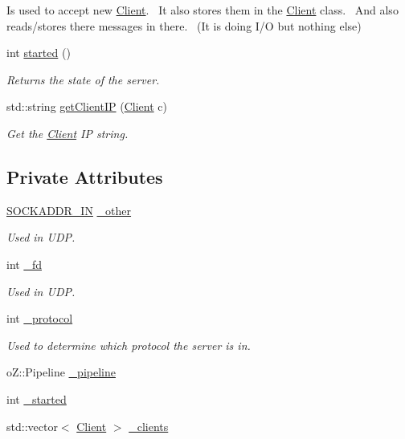 \begin{DoxyCompactItemize}
\begin{DoxyCompactList}
 Is used to accept new \mbox{\hyperlink{classClient}{Client}}.~\newline
 It also stores them in the \mbox{\hyperlink{classClient}{Client}} class.~\newline
 And also reads/stores there messages in there.~\newline
 (It is doing I/O but nothing else)~\newline
 \end{DoxyCompactList}\item 
int \mbox{\hyperlink{classNetworkManager_a5765a63a11c9b5ee4dfb1f264ca002eb}{started}} ()
\begin{DoxyCompactList}\small\item\em Returns the state of the server. \end{DoxyCompactList}\item 
std\+::string \mbox{\hyperlink{classNetworkManager_aeec2cdb10fa286ccf9170ce3a2192202}{get\+Client\+IP}} (\mbox{\hyperlink{classClient}{Client}} c)
\begin{DoxyCompactList}\small\item\em Get the \mbox{\hyperlink{classClient}{Client}} IP string. \end{DoxyCompactList}\end{DoxyCompactItemize}
\subsection*{Private Attributes}
\begin{DoxyCompactItemize}
\item 
\mbox{\hyperlink{NetworkManager_8hpp_a6a34800fb5689e853f978b485a41aa39}{S\+O\+C\+K\+A\+D\+D\+R\+\_\+\+IN}} \mbox{\hyperlink{classNetworkManager_af8625dfbba34d3b7683fd6ccf1afb3aa}{\+\_\+other}}
\begin{DoxyCompactList}\small\item\em Used in U\+DP. \end{DoxyCompactList}\item 
int \mbox{\hyperlink{classNetworkManager_af3fdb76b224890526f93952bbff33a9a}{\+\_\+fd}}
\begin{DoxyCompactList}\small\item\em Used in U\+DP. \end{DoxyCompactList}\item 
int \mbox{\hyperlink{classNetworkManager_aa2c4503597d1a64439912f20a9799ec3}{\+\_\+protocol}}
\begin{DoxyCompactList}\small\item\em Used to determine which protocol the server is in. \end{DoxyCompactList}\item 
o\+Z\+::\+Pipeline \mbox{\hyperlink{classNetworkManager_a63ace6e62f363661c718b17a738107dc}{\+\_\+pipeline}}
\item 
int \mbox{\hyperlink{classNetworkManager_acf160e0d3b59613ab6ff8084637a79ed}{\+\_\+started}}
\item 
std\+::vector$<$ \mbox{\hyperlink{classClient}{Client}} $>$ \mbox{\hyperlink{classNetworkManager_a267bb2580a6c21a814971a8e74c4dc37}{\+\_\+clients}}
\end{DoxyCompactItemize}


